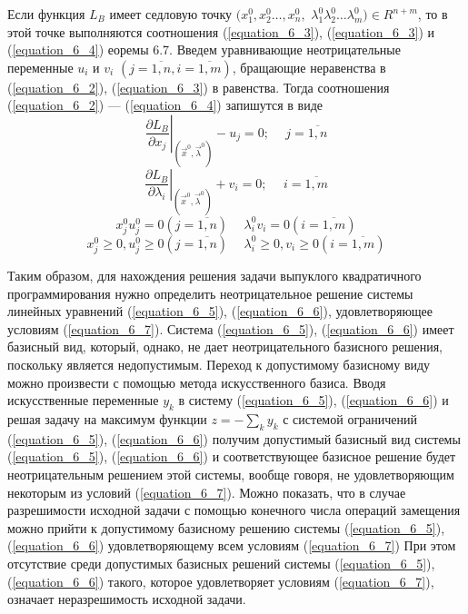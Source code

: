 {Если функция $L_B$ имеет седловую точку $(x_1^0,x_2^0\dots,x_n^0,$ $\lambda_1^0\lambda_2^0\dots\lambda_m^0) \in R^{n+m}$, то в этой точке выполняются соотношения (\ref {equation_6_3}), (\ref {equation_6_3}) и (\ref {equation_6_4}) еоремы 6.7. Введем уравнивающие неотрицательные переменные $u_i$ и $v_i$ $(j = \overline{1,n}, i = \overline{1,m})$, бращающие неравенства в (\ref {equation_6_2}), (\ref {equation_6_3}) в равенства.
Тогда соотношения (\ref {equation_6_2}) --- (\ref {equation_6_4}) запишутся в виде
\begin{equation}
\left.\frac{\partial L_B}{\partial x_j}\right|_{(\vec x^0, \vec \lambda^0)} - u_j = 0;
\hspace{15pt} j = \overline{1,n}
\label{equation_6_5}
\end{equation}
\begin{equation}
\left.\frac{\partial L_B}{\partial \lambda_i}\right|_{(\vec x^0, \vec \lambda^0)} + v_i = 0;
\hspace{15pt} i = \overline{1,m}
\label{equation_6_6}
\end{equation}
\begin{equation}
x_j^0u_j^0 = 0 (j = \overline{1,n})
\hspace{15pt} \lambda_i^0 v_i = 0 ( i = \overline{1,m})
\label{equation_6_7}
\end{equation}
\begin{equation}
x_j^0 \geqslant 0, u_j^0 \geqslant 0 (j = \overline{1,n})
\hspace{15pt} \lambda_i^0 \geqslant 0 , v_i  \geqslant 0 ( i = \overline{1,m})
\label{equation_6_8}
\end{equation}

Таким образом, для нахождения решения задачи выпуклого квадратичного программирования нужно определить неотрицательное решение системы линейных уравнений (\ref{equation_6_5}), (\ref{equation_6_6}), удовлетворяющее условиям (\ref{equation_6_7}). Система (\ref{equation_6_5}), (\ref{equation_6_6}) имеет базисный вид, который, однако, не дает неотрицательного базисного решения, поскольку является недопустимым. Переход к допустимому базисному виду можно произвести с помощью метода искусственного базиса. Вводя искусственные переменные $y_k$ в систему  (\ref{equation_6_5}), (\ref{equation_6_6}) и решая задачу на максимум функции $z = - \sum\limits_k y_k$ с системой ограничений (\ref{equation_6_5}), (\ref{equation_6_6}) получим допустимый базисный вид системы (\ref{equation_6_5}), (\ref{equation_6_6}) и соответствующее базисное решение будет неотрицательным решением этой системы, вообще говоря, не удовлетворяющим некоторым из условий (\ref{equation_6_7}). Можно показать, что в случае разрешимости исходной задачи с помощью конечного числа операций замещения можно прийти к допустимому базисному решению системы (\ref{equation_6_5}), (\ref{equation_6_6}) удовлетворяющему всем условиям (\ref{equation_6_7}) При этом отсутствие среди допустимых базисных решений системы (\ref{equation_6_5}), (\ref{equation_6_6}) такого, которое удовлетворяет условиям (\ref{equation_6_7}), означает неразрешимость исходной задачи.

}
